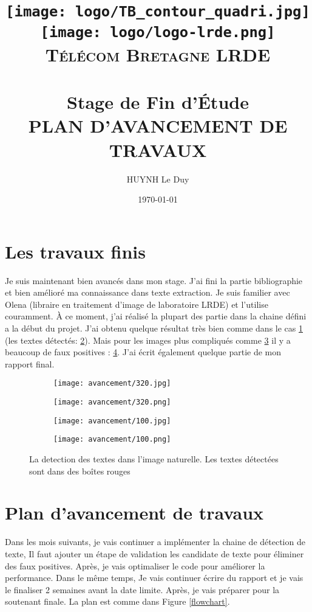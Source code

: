 \documentclass[12pt,a4paper]{article}
\title{	
\normalfont \normalsize
\hspace{1.5 cm}
\texttt{[image: logo/TB\_contour\_quadri.jpg]}
\hspace{10 cm}
\texttt{[image: logo/logo-lrde.png]} \\ [2pt]
\textsc{Télécom Bretagne} 
\hspace{9.5 cm}
\textsc{LRDE} \\ [25pt] %
\horrule{0.5pt} \\[0.4cm] %
\huge Stage de Fin d'Étude \\ %
\textsc{PLAN D'AVANCEMENT DE TRAVAUX}
\horrule{2pt} \\[0.5cm] %
}
\author{HUYNH Le Duy} %
\date{\normalsize\today} %
\begin{document}
\maketitle %
\section{Les travaux finis}
Je suis maintenant bien avancés dans mon stage. J'ai fini la partie bibliographie et bien amélioré ma connaissance dans texte extraction. Je suis familier avec Olena (libraire en traitement d'image de laboratoire LRDE) et l'utilise couramment. À ce moment, j'ai réalisé la plupart des partie dans la chaine défini a la début du projet. J'ai obtenu quelque résultat très bien comme dans le cas \ref{ori} (les textes détectés: \ref{text}). 
Mais pour les images plus compliqués comme \ref{ori2} il y a  beaucoup de faux positives : \ref{text2}.
J'ai écrit également quelque partie de mon rapport final.
\begin{figure}
        \centering
        \begin{subfigure}[b]{0.3\textwidth}
                \texttt{[image: avancement/320.jpg]}
                \caption{}
                \label{ori}
        \end{subfigure}
        \begin{subfigure}[b]{0.3\textwidth}
                \texttt{[image: avancement/320.png]}
                \caption{}
                \label{text}
        \end{subfigure}
        
        
        \begin{subfigure}[b]{0.3\textwidth}
                \texttt{[image: avancement/100.jpg]}
                \caption{}
                \label{ori2}
        \end{subfigure}
        \begin{subfigure}[b]{0.3\textwidth}
                \texttt{[image: avancement/100.png]}
                \caption{}
                \label{text2}
        \end{subfigure}        
        \caption{La detection des textes dans l'image naturelle. Les textes détectées sont dans des boîtes rouges}\label{textDetection}
\end{figure}
\section{Plan d'avancement de travaux}
Dans les mois suivants, je vais continuer a implémenter la chaine de détection de texte, Il faut ajouter un étape de validation les candidate de texte pour éliminer des faux positives. Après, je vais optimaliser le code pour améliorer la performance. Dans le même temps, Je vais continuer écrire du rapport et je vais le finaliser 2 semaines avant la date limite. Après, je vais préparer pour la soutenant finale. La plan est comme dans Figure \ref{flowchart}.
\end{document}
